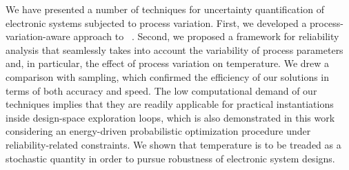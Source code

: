 We have presented a number of techniques for uncertainty quantification of electronic systems subjected to process variation.
First, we developed a process-variation-aware approach to \DSS\ \ta.
Second, we proposed a framework for reliability analysis that seamlessly takes into account the variability of process parameters and, in particular, the effect of process variation on temperature.
We drew a comparison with  sampling, which confirmed the efficiency of our solutions in terms of both accuracy and speed.
The low computational demand of our techniques implies that they are readily applicable for practical instantiations inside design-space exploration loops, which is also demonstrated in this work considering an energy-driven probabilistic optimization procedure under reliability-related constraints.
We shown that temperature is to be treaded as a stochastic quantity in order to pursue robustness of electronic system designs.
